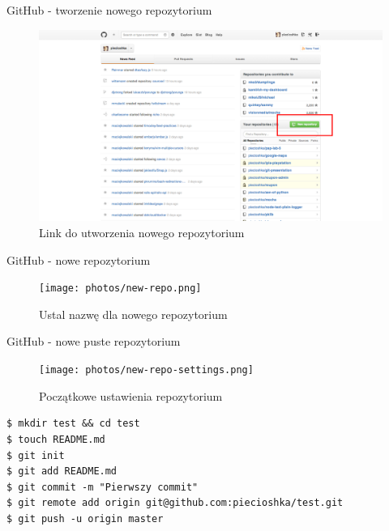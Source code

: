 \documentclass{beamer}
\begin{document}
\begin{frame}{GitHub - tworzenie nowego repozytorium}
  \begin{figure}
  \includegraphics[width=\textwidth]{photos/create-repo-link.png}
  \caption{\label{fig:create-repo-link}Link do utworzenia nowego repozytorium}
  \end{figure}
\end{frame}

\begin{frame}{GitHub - nowe repozytorium}
  \begin{figure}
  \texttt{[image: photos/new-repo.png]}
  \caption{\label{fig:new-repo}Ustal nazwę dla nowego repozytorium}
  \end{figure}
\end{frame}

\begin{frame}{GitHub - nowe puste repozytorium}
  \begin{figure}
  \texttt{[image: photos/new-repo-settings.png]}
  \caption{\label{fig:new-repo-settings}Początkowe ustawienia repozytorium}
  \end{figure}
\end{frame}

\begin{framed}
\begin{lstlisting}[frame=none, caption=Pierwszy projekt]
$ mkdir test && cd test
$ touch README.md
$ git init
$ git add README.md
$ git commit -m "Pierwszy commit"
$ git remote add origin git@github.com:piecioshka/test.git
$ git push -u origin master
\end{lstlisting}
\end{framed}
\end{document}
